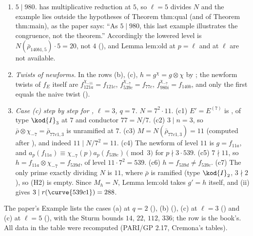 \begin{example}
\begin{enumerate}[label=(\roman*)]
contains , the twist of  ($\kod{I}_5^*$), and , the twist of  ($\kod{I}_1^*$). The class 539d of $f_{11a}\otimes\chi_{-7}$ contains , the
twist of ; the twist of  by $\chi_{-7}$ is . Every quantity in the theorem depends only on the class: $r$ does, and $v_\ell(\deg\varphi)$ of
the optimal curve is what the theorem concerns.
\item \emph{$5\mid980$.}  has multiplicative reduction at $5$, so $\ell=5$ divides $N$ and the example lies outside the hypotheses of Theorem thm:qual (and of Theorem
thm:main), as the paper says: ``As $5\mid980$, this last example illustrates the congruence, not the theorem.'' Accordingly the lowered level is
$N(\bar\rho_{140b1,5})\cdot5=20$, not $4$ (), and Lemma lem:old at $p=\ell$ and  at $\ell$ are not available.
\item \emph{Twists of newforms.} In the rows (b), (c), $h=g^\chi=g\otimes\chi$ by ; the newform twists of $f_E$ itself are $f_{121a}^{\chi_{-11}}=f_{121c}$,
$f_{539c}^{\chi_{-7}}=f_{77c}$, $f_{980i}^{\chi_{-7}}=f_{140b}$, and only the first equals the naive twist ().
\item \emph{Case (c) step by step for , $\ell=3$, $q=7$.} $N=7^2\cdot11$. (c1) $E'=E^{(7)}$ is , of type $\kod{I}_3$ at $7$ and conductor $77=N/7$. (c2) $3\mid n=3$, so
$\bar\rho\otimes\chi_{-7}=\bar\rho_{77c1,3}$ is unramified at $7$. (c3) $M=N(\bar\rho_{77c1,3})=11$ (computed after ), and indeed $11\mid N/7^2=11$. (c4) The
newform of level $11$ is $g=f_{11a}$, and $a_p(f_{11a})\equiv\chi_{-7}(p)a_p(f_{539c})\pmod3$ for $p\nmid3\cdot539$. (c5) $7\nmid11$, so $h=f_{11a}\otimes\chi_{-7}=f_{539d}$, of level $11\cdot7^2=539$. (c6) $h=f_{539d}\ne
f_{539c}$. (c7) The only prime exactly dividing $N$ is $11$, where $\bar\rho$ is ramified (type $\kod{I}_2$, $3\nmid2$), so (H2) is empty. Since $M_h=N$, Lemma lem:old takes $g'=h$ itself, and
(ii) gives $3\mid r(\curve{539c1})=288$.
\end{enumerate}
\end{example}

\begin{paperlink}
The paper's Example lists the cases (a) at $q=2$ (), (b) (), (c) at $\ell=3$ () and (c) at $\ell=5$ (), with the Sturm bounds $14$, $22$, $112$,
$336$; the row  is the book's. All data in the table were recomputed (PARI/GP 2.17, Cremona's tables).
\end{paperlink}

